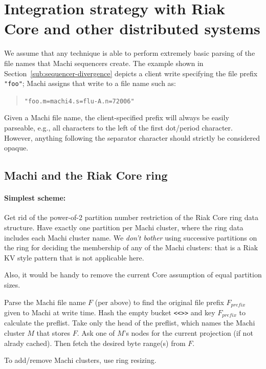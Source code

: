 \documentclass[preprint,10pt]{sigplanconf}
\begin{document}
\section{Integration strategy with Riak Core and other distributed systems}
\label{sec:integration}

We assume that any technique is able to perform extremely basic
parsing of the file names that Machi sequencers create.  The example
shown in Section~\ref{sub:sequencer-divergence} depicts a client write
specifying the file prefix {\tt "foo"}; Machi assigns that write to a
file name such as:
\begin{quote}
{\tt "foo.m=machi4.s=flu-A.n=72006"}
\end{quote}

Given a Machi file name, the client-specified prefix will always be
easily parseable, e.g., all characters to the left of the first
dot/period character.  However, anything following the separator
character should strictly be considered opaque.

\subsection{Machi and the Riak Core ring}
\label{sub:integration-riak-core}

\paragraph{Simplest scheme:}
Get rid of the power-of-2 partition number restriction of the Riak
Core ring data structure.  Have exactly one partition per Machi
cluster, where the ring data includes each Machi cluster name.  We
{\em don't bother} using successive partitions on the ring for
deciding the membership of any of the Machi clusters: that is a Riak KV
style pattern that is not applicable here.

Also, it would be handy to remove the current Core assumption of equal
partition sizes.

Parse the Machi file name $F$ (per above) to find the original
file prefix $F_{prefix}$ given to Machi at write time.
Hash the empty bucket {\tt <<>>} and key $F_{prefix}$ to
calculate the preflist. Take only the head of
the preflist, which names the Machi cluster $M$ that stores $F$.  Ask
one of $M$'s nodes for the current projection (if not alrady cached).
Then fetch the desired byte range(s) from $F$.

To add/remove Machi clusters, use ring resizing.  
\end{document}
